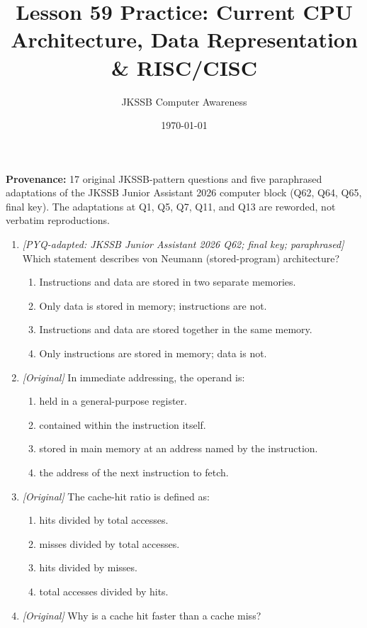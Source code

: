 \documentclass[11pt]{article}
\title{Lesson 59 Practice: Current CPU Architecture, Data Representation \& RISC/CISC}
\author{JKSSB Computer Awareness}
\date{\today}
\begin{document}
\maketitle
\noindent\textbf{Provenance:} 17 original JKSSB-pattern questions and five
paraphrased adaptations of the JKSSB Junior Assistant 2026 computer block
(Q62, Q64, Q65, final key). The adaptations at Q1, Q5, Q7, Q11, and Q13 are
reworded, not verbatim reproductions.

\begin{enumerate}[label=\textbf{Q\arabic*.}, leftmargin=*]
\item \textit{[PYQ-adapted: JKSSB Junior Assistant 2026 Q62; final key;
paraphrased]} Which statement describes von Neumann (stored-program)
architecture?
  \begin{enumerate}[label=\Alph*.]
    \item Instructions and data are stored in two separate memories.
    \item Only data is stored in memory; instructions are not.
    \item Instructions and data are stored together in the same memory.
    \item Only instructions are stored in memory; data is not.
  \end{enumerate}
\item \textit{[Original]} In immediate addressing, the operand is:
  \begin{enumerate}[label=\Alph*.]
    \item held in a general-purpose register.
    \item contained within the instruction itself.
    \item stored in main memory at an address named by the instruction.
    \item the address of the next instruction to fetch.
  \end{enumerate}
\item \textit{[Original]} The cache-hit ratio is defined as:
  \begin{enumerate}[label=\Alph*.]
    \item hits divided by total accesses.
    \item misses divided by total accesses.
    \item hits divided by misses.
    \item total accesses divided by hits.
  \end{enumerate}
\item \textit{[Original]} Why is a cache hit faster than a cache miss?

\end{enumerate}
\end{document}
